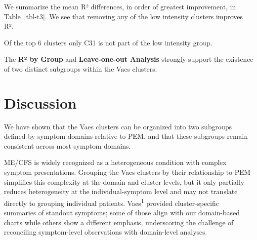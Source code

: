 \documentclass[
  letterpaper,
  DIV=11,
  numbers=noendperiod]{scrartcl}
\begin{document}
We summarize the mean R² differences, in order of greatest improvement,
in Table~\ref{tbl-t3}. We see that removing any of the low intensity
clusters improves R².

\begin{table}

\caption{\label{tbl-t3}Leave-one-out Analysis}


\end{table}%

Of the top 6 clusters only C31 is not part of the low intensity group.

The \textbf{R² by Group} and \textbf{Leave-one-out Analysis} strongly
support the existence of two distinct subgroups within the Vaes
clusters.

\FloatBarrier

\section{Discussion}\label{discussion}

We have shown that the Vaes clusters can be organized into two subgroups
defined by symptom domains relative to PEM, and that these subgroups
remain consistent across most symptom domains.

ME/CFS is widely recognized as a heterogeneous condition with complex
symptom presentations. Grouping the Vaes clusters by their relationship
to PEM simplifies this complexity at the domain and cluster levels, but
it only partially reduces heterogeneity at the individual-symptom level
and may not translate directly to grouping individual patients.
Vaes\textsuperscript{1} provided cluster-specific summaries of standout
symptoms; some of those align with our domain-based charts while others
show a different emphasis, underscoring the challenge of reconciling
symptom-level observations with domain-level analyses.
\end{document}
